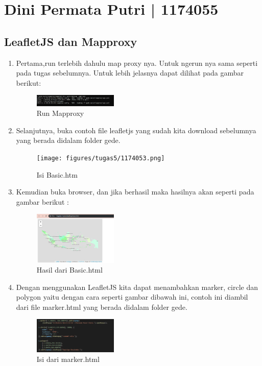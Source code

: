 \section{Dini Permata Putri | 1174055}
\subsection{LeafletJS dan Mapproxy}
\begin{enumerate}
\item Pertama,run terlebih dahulu map proxy nya. Untuk ngerun nya sama seperti pada tugas sebelumnya. Untuk lebih jelasnya dapat dilihat pada gambar berikut:
\hfill\break
\begin{figure}[H]
\includegraphics[width=4cm]{figures/tugas5/1174053/1.png}
\centering
\caption{Run Mapproxy}
\end{figure}
    
\item Selanjutnya, buka contoh file leafletjs yang sudah kita download sebelumnya yang berada didalam folder gede. 
\hfill\break
\begin{figure}[H]
\texttt{[image: figures/tugas5/1174053.png]}
\centering
\caption{Isi Basic.htm}
\end{figure}
    
\item Kemudian buka browser, dan jika berhasil maka hasilnya akan seperti pada gambar berikut :
\hfill\break
\begin{figure}[H]
\includegraphics[width=4cm]{figures/tugas5/1174053/3.png}
\centering
\caption{Hasil dari Basic.html}
\end{figure}
  
\item Dengan menggunakan LeafletJS kita dapat menambahkan marker, circle dan polygon yaitu dengan cara seperti gambar dibawah ini, contoh ini diambil dari file marker.html yang berada didalam folder gede.
\hfill\break
\begin{figure}[H]
\includegraphics[width=4cm]{figures/tugas5/1174053/4.png}
\centering
\caption{Isi dari marker.html}
\end{figure}
  

\end{enumerate}
